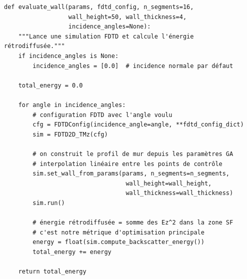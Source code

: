 \documentclass[12pt,a4paper]{article}
\begin{document}
\begin{lstlisting}[caption={Calcul de la fitness (src/optim/fitness.py -- extraits)}]
def evaluate_wall(params, fdtd_config, n_segments=16,
                  wall_height=50, wall_thickness=4,
                  incidence_angles=None):
    """Lance une simulation FDTD et calcule l'énergie rétrodiffusée."""
    if incidence_angles is None:
        incidence_angles = [0.0]  # incidence normale par défaut

    total_energy = 0.0

    for angle in incidence_angles:
        # configuration FDTD avec l'angle voulu
        cfg = FDTDConfig(incidence_angle=angle, **fdtd_config_dict)
        sim = FDTD2D_TMz(cfg)

        # on construit le profil de mur depuis les paramètres GA
        # interpolation linéaire entre les points de contrôle
        sim.set_wall_from_params(params, n_segments=n_segments,
                                  wall_height=wall_height,
                                  wall_thickness=wall_thickness)
        sim.run()

        # énergie rétrodiffusée = somme des Ez^2 dans la zone SF
        # c'est notre métrique d'optimisation principale
        energy = float(sim.compute_backscatter_energy())
        total_energy += energy

    return total_energy
\end{lstlisting}


\newpage


\end{document}
